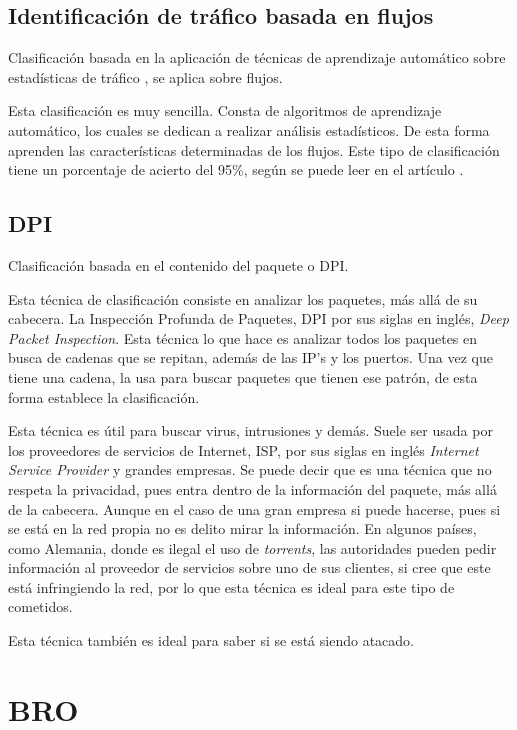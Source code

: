 \subsection{Identificación de tráfico basada en flujos}

Clasificación basada en la aplicación de técnicas de aprendizaje automático sobre estadísticas 
de tráfico \cite{learning}, se aplica sobre flujos.

\intro Esta clasificación es muy sencilla. Consta de algoritmos de aprendizaje automático, los cuales se 
dedican a realizar análisis estadísticos. De esta forma aprenden las características determinadas de 
los flujos. Este tipo de clasificación tiene un porcentaje de acierto del 95\%, según se puede leer en el 
artículo \cite{comparacion}.

\subsection{DPI}

Clasificación basada en el contenido del paquete o DPI. \cite{payload}

\intro Esta técnica de clasificación consiste en analizar los paquetes, más allá de su cabecera. La Inspección Profunda 
de Paquetes, DPI por sus siglas en inglés, \textit{Deep Packet Inspection}. Esta técnica lo que hace es 
analizar todos los paquetes en busca de cadenas que se repitan, además de las IP's y los puertos. Una vez que 
tiene una cadena, la usa para buscar paquetes que tienen ese patrón, de esta forma establece la clasificación.

\intro Esta técnica es útil para buscar virus, intrusiones y demás. Suele ser usada por los proveedores de 
servicios de Internet, ISP, por sus siglas en inglés \textit{Internet Service Provider} y grandes empresas. 
Se puede decir que es una técnica que no respeta la privacidad, pues entra dentro de la información del paquete, 
más allá de la cabecera. Aunque en el caso de una gran empresa si puede hacerse, pues si se está en la red propia 
no es delito mirar la información. En algunos países, como Alemania, donde es ilegal el uso de \textit{torrents}, 
las autoridades pueden pedir información al proveedor de servicios sobre uno de sus clientes, si cree que este 
está infringiendo la red, por lo que esta técnica es ideal para este tipo de cometidos.

\intro Esta técnica también es ideal para saber si se está siendo atacado. \cite{dpiaproximacion}

\section{BRO}

